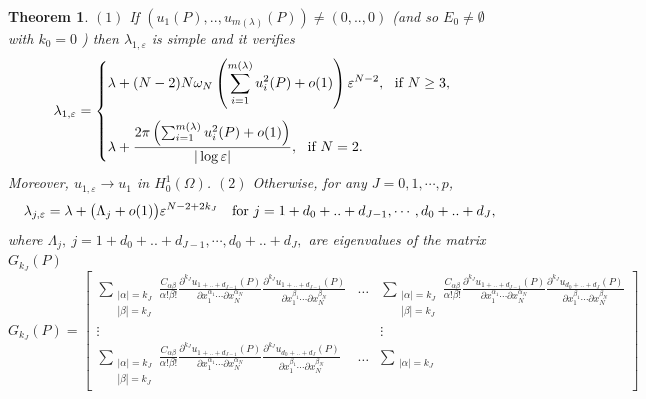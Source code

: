 \documentclass[11pt,reqno]{article}
\newtheorem{teo}{Theorem}[section]
\numberwithin{equation}{section}
\newcommand\e\varepsilon
\newcommand\la\lambda
\newcommand\La\Lambda
\renewcommand\o\omega
\renewcommand\O\Omega
\begin{document}
\begin{teo}
        $(1)$ If $(u_1(P),..,u_{m(\lambda)}(P))\neq(0,..,0)$ (and so $E_0\ne\emptyset$ with $k_0=0$ ) then $\la_{1,\e}$ is simple and it verifies 
		\begin{equation}\label{i16}
        \la_{1,\e}=
        \begin{cases}
            \displaystyle\la +(N-2)N\o_N\left(\sum_{i=1}^{m(\lambda)}u_i^2(P)+o(1)\right)\e^{N-2}, \ \ \hbox{if } N\ge 3,\vspace{3mm}\\
           \displaystyle\la +\frac{2\pi\left(\sum_{i=1}^{m(\lambda)}u_i^2(P)+o(1)\right)}{|\log\e|}, \ \ \hbox{if } N=2.\\
        \end{cases}
			\end{equation}
    Moreover, $u_{1,\e}\to u_1$ in $H^1_0(\O)$.
    \vskip0.2cm
    $(2)$ Otherwise, for any $J=0,1,\cdots,p$, 
			\begin{equation}\label{d12}
				\la_{j,\e}=\la +\big(\La_j+o(1)\big)\e^{N-2+2k_J}\quad\hbox{for  }j=1+d_0+..+d_{J-1},\cdots,d_0+..+d_J,
			\end{equation}
 where $\La_j,\ j=1+d_0+..+d_{J-1},\cdots,d_0+..+d_J,$ are eigenvalues of the matrix $G_{k_J}(P)$
$$
	\!\!\!\!\!\!\!\!\!\!\!\!\!\!\!\!\!\!\!\!\!\!\!G_{k_J}(P)=
\begin{bmatrix}
\displaystyle\sum_{\substack{|\alpha|={ k_J}\\
           |\beta|={ k_J}}}\frac{C_{\alpha\beta}}{\alpha!\beta!}\frac{\partial^{{ k_J}} u_{1+..+d_{J-1}} (P)}{\partial x_{1}^{\alpha_1}\cdots\partial x_{N}^{\alpha_N}}\frac{\partial^{{ k_J}} u_{1+..+d_{J-1}} (P)}{\partial x_{1}^{\beta_1}\cdots\partial x_{N}^{\beta_N}} &\dots & \displaystyle\sum_{\substack{|\alpha|={ k_J}\\
           |\beta|={ k_J}}}\frac{C_{\alpha\beta}}{\alpha!\beta!}\frac{\partial^{{ k_J}} u_{1+..+d_{J-1}} (P)}{\partial x_{1}^{\alpha_1}\cdots\partial x_{N}^{\alpha_N}}\frac{\partial^{{ k_J}} u_{d_0+..+d_J} (P)}{\partial x_{1}^{\beta_1}\cdots\partial x_{N}^{\beta_N}} \\
    \vdots&  &\vdots\\
  \displaystyle \sum_{\substack{|\alpha|={ k_J}\\
           |\beta|={ k_J}}}\frac{C_{\alpha\beta}}{\alpha!\beta!}\frac{\partial^{{ k_J}} u_{1+..+d_{J-1}} (P)}{\partial x_{1}^{\alpha_1}\cdots\partial x_{N}^{\alpha_N}}\frac{\partial^{{ k_J}} u_{d_0+..+d_J} (P)}{\partial x_{1}^{\beta_1}\cdots\partial x_{N}^{\beta_N}} &\dots & \displaystyle\sum_{\substack{|\alpha|={ k_J}\\
}}
\end{bmatrix}$$
\end{teo}
\end{document}
